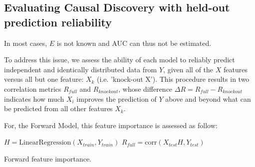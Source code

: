 \begin{figure}
  \centering
  \label{}
\end{figure}


\subsection{Evaluating Causal Discovery with held-out prediction reliability}

In most cases, $E$ is not known and AUC can thus not be estimated.

To address this issue, we assess the ability of each model to reliably predict
independent and identically distributed data from $Y$, given all of the $X$
features versus all but one feature: $X_k$ (i.e. 'knock-out X'). This procedure
results in two correlation metrics $R_{full}$ and $R_{knockout}$, whose
difference $\Delta R=R_{full}-R_{knockout}$ indicates how much $X_i$ improves
the prediction of $Y$ above and beyond what can be predicted from all other
features $X_k$.

For, the Forward Model, this feature importance is assessed as follow:

\begin{algorithm}[H]
      $H = \text{LinearRegression}(X_{train},
Y_{train})$\; $R_{full} = \text{corr}(X_{test} H, Y_{test})$\;

     
\caption{Forward feature importance.} \label{algorithm:fwd_fi} \end{algorithm}

